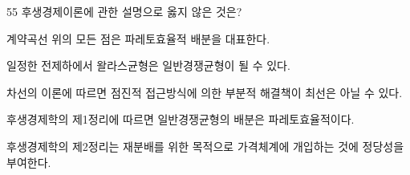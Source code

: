 \begin{question}{55}
후생경제이론에 관한 설명으로 옳지 않은 것은?
\begin{choices}
  \item 계약곡선 위의 모든 점은 파레토효율적 배분을 대표한다.
  \item 일정한 전제하에서 왈라스균형은 일반경쟁균형이 될 수 있다.
  \item 차선의 이론에 따르면 점진적 접근방식에 의한 부분적 해결책이 최선은 아닐 수 있다.
  \item 후생경제학의 제1정리에 따르면 일반경쟁균형의 배분은 파레토효율적이다.
  \item 후생경제학의 제2정리는 재분배를 위한 목적으로 가격체계에 개입하는 것에 정당성을 부여한다.
\end{choices}
\end{question}

